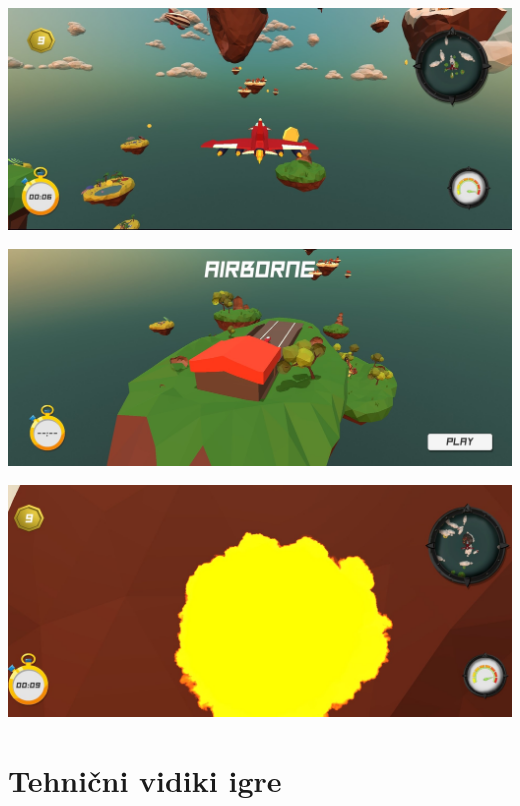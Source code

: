 \documentclass[a4paper]{article}
\begin{document}
\begin{center}
     \includegraphics[width=\columnwidth]{game.jpg}
\end{center}

\begin{center}
     \includegraphics[width=\columnwidth]{mainmenu.jpg}
\end{center}

\begin{center}
     \includegraphics[width=\columnwidth]{eksplozija.jpg}
\end{center}

\section{Tehnični vidiki igre}
\end{document}
